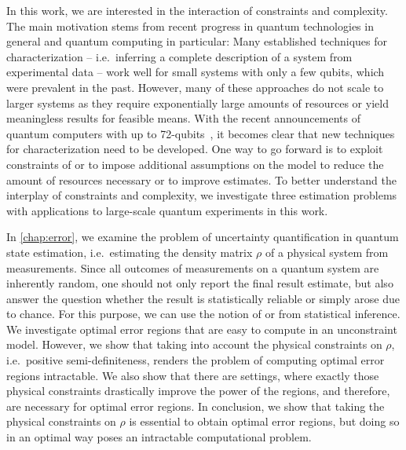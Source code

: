 In this work, we are interested in the interaction of constraints and complexity.
The main motivation stems from recent progress in quantum technologies in general and quantum computing in particular:
Many established techniques for characterization -- i.e.\ inferring a complete description of a system from experimental data -- work well for small systems with only a few qubits, which were prevalent in the past.
However, many of these approaches do not scale to larger systems as they require exponentially large amounts of resources or yield meaningless results for feasible means.
With the recent announcements of quantum computers with up to 72-qubits~\cite{Sciencenews}, it becomes clear that new techniques for characterization need to be developed.
One way to go forward is to exploit constraints of or to impose additional assumptions on the model to reduce the amount of resources necessary or to improve estimates.
To better understand the interplay of constraints and complexity, we investigate three estimation problems with applications to large-scale quantum experiments in this work.

In \cref{chap:error}, we examine the problem of uncertainty quantification in quantum state estimation, i.e.\ estimating the density matrix $\rho$ of a physical system from measurements.
Since all outcomes of measurements on a quantum system are inherently random, one should not only report the final result estimate, but also answer the question whether the result is statistically reliable or simply arose due to chance.
For this purpose, we can use the notion of  or  from statistical inference.
We investigate optimal error regions that are easy to compute in an unconstraint model.
However, we show that taking into account the physical constraints on $\rho$, i.e.\ positive semi-definiteness, renders the problem of computing optimal error regions intractable.
We also show that there are settings, where exactly those physical constraints drastically improve the power of the regions, and therefore, are necessary for optimal error regions.
In conclusion, we show that taking the physical constraints on $\rho$ is essential to obtain optimal error regions, but doing so in an optimal way poses an intractable computational problem.

